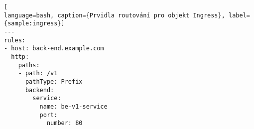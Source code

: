 \begin{lstfloat}
\begin{lstlisting}[
language=bash, caption={Prvidla routování pro objekt Ingress}, label={sample:ingress}]
---
rules:
- host: back-end.example.com
  http:
    paths:
    - path: /v1
      pathType: Prefix
      backend:
        service:
          name: be-v1-service
          port: 
            number: 80
\end{lstlisting}
\end{lstfloat}